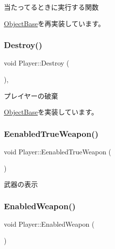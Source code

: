 当たってるときに実行する関数 



\mbox{\hyperlink{class_object_base_a3e1db79dfa119be067d816c22d09839d}{Object\+Base}}を再実装しています。

\mbox{\label{class_player_af2cf4936165ef12cce96f7994e0879df}} 
\subsubsection{\texorpdfstring{Destroy()}{Destroy()}}
{\footnotesize\ttfamily void Player\+::\+Destroy (\begin{DoxyParamCaption}{ }\end{DoxyParamCaption})\hspace{0.3cm}{\ttfamily [final]}, {\ttfamily [virtual]}}



プレイヤーの破棄 



\mbox{\hyperlink{class_object_base_a7fa4c548153c3af20f89673ffea809af}{Object\+Base}}を実装しています。

\mbox{\label{class_player_a97012a8b2bead252582ff39e852961ac}} 
\subsubsection{\texorpdfstring{Eenabled\+True\+Weapon()}{EenabledTrueWeapon()}}
{\footnotesize\ttfamily void Player\+::\+Eenabled\+True\+Weapon (\begin{DoxyParamCaption}{ }\end{DoxyParamCaption})\hspace{0.3cm}{\ttfamily [inline]}}



武器の表示 

\mbox{\label{class_player_a615af41886fe293fcc3c6f276de77991}} 
\subsubsection{\texorpdfstring{Enabled\+Weapon()}{EnabledWeapon()}}
{\footnotesize\ttfamily void Player\+::\+Enabled\+Weapon (\begin{DoxyParamCaption}{ }\end{DoxyParamCaption})\hspace{0.3cm}{\ttfamily [inline]}}



